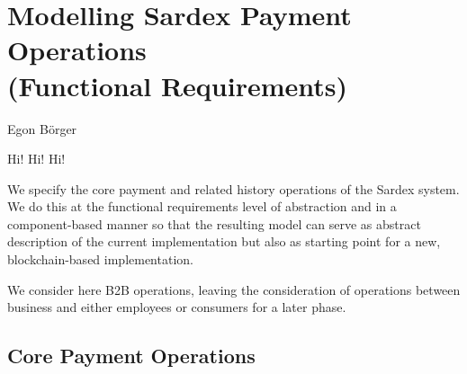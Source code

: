 \chapter{Modelling Sardex Payment Operations\\ (Functional Requirements)}
\label{ch:funreq}


\vspace{-1cm}
\begin{center}
Egon B\"orger
\end{center}


Hi! Hi! Hi!

\noindent{}
\vspace{12pt}

We specify the core payment and related history operations of the Sardex system. We do this at the functional requirements  level of abstraction and in a component-based manner so that the resulting model can serve as abstract description of the current implementation but also as starting point for a new, blockchain-based implementation.

We consider here B2B operations, leaving the consideration of operations between business and either employees or consumers for a later phase.

\section{Core Payment Operations}

